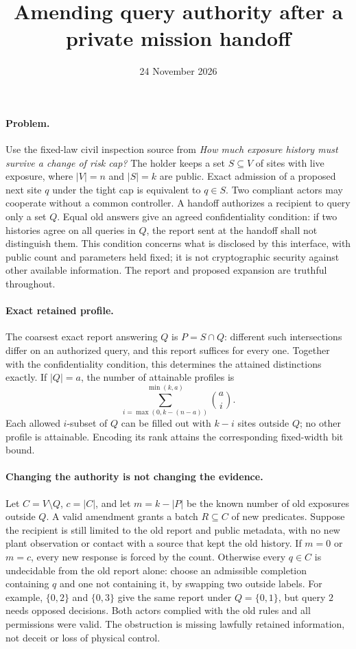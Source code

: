 \documentclass[11pt]{article}
\title{Amending query authority after a private mission handoff}
\date{24 November 2026}
\begin{document}
\maketitle

\paragraph{Problem.}
Use the fixed-law civil inspection source from \emph{How much exposure
history must survive a change of risk cap?} The holder keeps a set
\(S\subseteq V\) of sites with live exposure, where \(|V|=n\) and
\(|S|=k\) are public. Exact admission of a proposed next site \(q\)
under the tight cap is equivalent to \(q\in S\).
Two compliant actors may cooperate without a common controller.
A handoff authorizes a recipient to query only a set \(Q\).
Equal old answers give an agreed confidentiality condition: if two
histories agree on all queries in \(Q\), the report sent at the
handoff shall not distinguish them. This condition concerns what is
disclosed by this interface, with public count and parameters held fixed;
it is not cryptographic security against other available information.
The report and proposed expansion are truthful throughout.

\paragraph{Exact retained profile.}
The coarsest exact report answering \(Q\) is \(P=S\cap Q\):
different such intersections differ on an authorized query,
and this report suffices for every one. Together with the confidentiality
condition, this determines the attained distinctions exactly.
If \(|Q|=a\), the number of attainable profiles is
\[
  \sum_{i=\max(0,k-(n-a))}^{\min(k,a)} \binom ai.
\]
Each allowed \(i\)-subset of \(Q\) can be filled out with \(k-i\)
sites outside \(Q\); no other profile is attainable. Encoding its rank
attains the corresponding fixed-width bit bound.

\paragraph{Changing the authority is not changing the evidence.}
Let \(C=V\setminus Q\), \(c=|C|\), and let \(m=k-|P|\) be the
known number of old exposures outside \(Q\). A valid amendment grants
a batch \(R\subseteq C\) of new predicates. Suppose the recipient is
still limited to the old report and public metadata, with no new
plant observation or contact with a source that kept the old history.
If \(m=0\) or \(m=c\), every new response is forced by the count.
Otherwise every \(q\in C\) is undecidable from the old report alone:
choose an admissible completion containing \(q\) and one not containing
it, by swapping two outside labels. For example,
\(\{0,2\}\) and \(\{0,3\}\) give the same report under \(Q=\{0,1\}\),
but query \(2\) needs opposed decisions. Both actors complied with the
old rules and all permissions were valid. The obstruction is missing
lawfully retained information, not deceit or loss of physical control.
\end{document}
